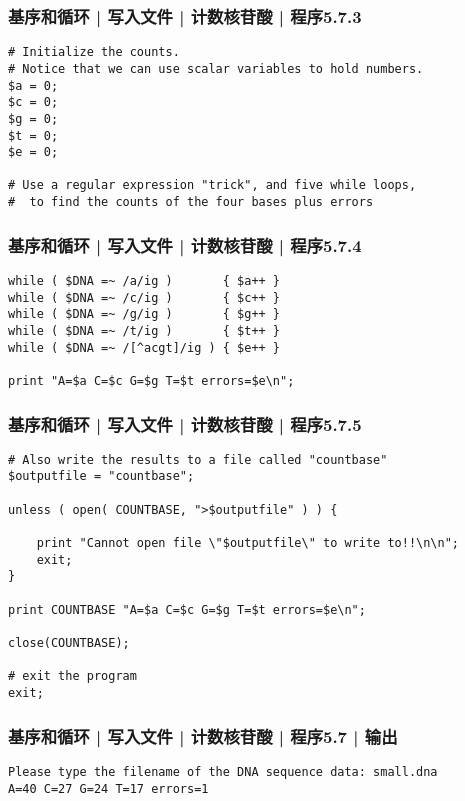 \begin{frame}[fragile]
  \frametitle{基序和循环 | 写入文件 | 计数核苷酸 | 程序5.7.3}
\begin{lstlisting}[firstnumber=34]
# Initialize the counts.
# Notice that we can use scalar variables to hold numbers.
$a = 0;
$c = 0;
$g = 0;
$t = 0;
$e = 0;

# Use a regular expression "trick", and five while loops,
#  to find the counts of the four bases plus errors
\end{lstlisting}
\end{frame}

\begin{frame}[fragile]
  \frametitle{基序和循环 | 写入文件 | 计数核苷酸 | 程序5.7.4}
\begin{lstlisting}[firstnumber=44]
while ( $DNA =~ /a/ig )       { $a++ }
while ( $DNA =~ /c/ig )       { $c++ }
while ( $DNA =~ /g/ig )       { $g++ }
while ( $DNA =~ /t/ig )       { $t++ }
while ( $DNA =~ /[^acgt]/ig ) { $e++ }

print "A=$a C=$c G=$g T=$t errors=$e\n";
\end{lstlisting}
\end{frame}

\begin{frame}[fragile]
  \frametitle{基序和循环 | 写入文件 | 计数核苷酸 | 程序5.7.5}
\begin{lstlisting}[firstnumber=52,basicstyle=\small\tt]
# Also write the results to a file called "countbase"
$outputfile = "countbase";

unless ( open( COUNTBASE, ">$outputfile" ) ) {

    print "Cannot open file \"$outputfile\" to write to!!\n\n";
    exit;
}

print COUNTBASE "A=$a C=$c G=$g T=$t errors=$e\n";

close(COUNTBASE);

# exit the program
exit;
\end{lstlisting}
\end{frame}

\begin{frame}[fragile]
  \frametitle{基序和循环 | 写入文件 | 计数核苷酸 | 程序5.7 | 输出}
\begin{lstlisting}
Please type the filename of the DNA sequence data: small.dna
A=40 C=27 G=24 T=17 errors=1
\end{lstlisting}
\end{frame}

